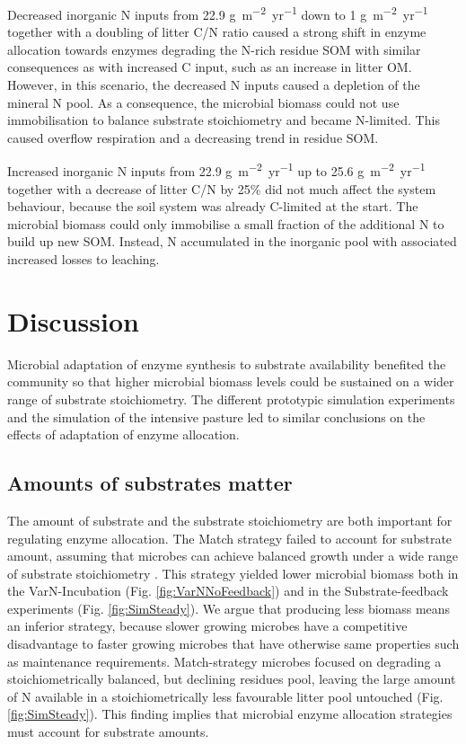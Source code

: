 Decreased inorganic N inputs from 22.9
\unit{g~m^{-2}yr^{-1}} down to 1
\unit{g~m^{-2}yr^{-1}} together with a doubling of litter C/N
ratio caused a strong shift in enzyme allocation towards enzymes degrading the
N-rich residue SOM with similar consequences as with increased C input,
such as an increase in litter OM. However, in this scenario, the decreased N inputs caused
a depletion of the mineral N pool.
As a consequence, the microbial biomass could not use immobilisation to
balance substrate stoichiometry and became N-limited.
This caused overflow respiration and a decreasing trend in residue SOM.

Increased inorganic N inputs from 22.9 \unit{g~m^{-2}yr^{-1}} up to 25.6
\unit{g~m^{-2}yr^{-1}} together with a decrease of litter C/N by 25\% did not
much affect the system behaviour, because the soil system was already C-limited
at the start. The microbial biomass could only immobilise a small fraction of the additional N to build 
up new SOM. Instead, N accumulated in the inorganic pool with associated
increased losses to leaching.

\section{Discussion}
Microbial adaptation of enzyme synthesis to substrate availability benefited the
community so that higher microbial biomass levels could be sustained on a wider
range of substrate stoichiometry.
The different prototypic simulation experiments and the simulation of the
intensive pasture led to similar conclusions on the effects of adaptation of
enzyme allocation.

\subsection{Amounts of substrates matter}
The amount of substrate and the substrate stoichiometry are both important for
regulating enzyme allocation. The Match strategy failed to account for substrate
amount, assuming that microbes can achieve balanced growth under a wide range of
substrate stoichiometry \citep{Moorhead12, Ballantyne14}. This strategy yielded
lower microbial biomass both in the VarN-Incubation (Fig.
\ref{fig:VarNNoFeedback}) and in the Substrate-feedback experiments (Fig.
\ref{fig:SimSteady}). We argue that producing less biomass means an inferior
strategy, because slower growing microbes have a competitive disadvantage to
faster growing microbes that have otherwise same properties such as
maintenance requirements. Match-strategy microbes focused on degrading a
stoichiometrically balanced, but declining residues pool, leaving the large
amount of N available in a stoichiometrically less favourable litter pool
untouched (Fig.
\ref{fig:SimSteady}). This finding implies that microbial enzyme allocation
strategies must account for substrate amounts.

